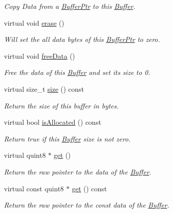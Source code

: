 \begin{DoxyCompactItemize}
\begin{DoxyCompactList}\small\item\em Copy Data from a \hyperlink{class_gost_crypt_1_1_buffer_ptr}{Buffer\+Ptr} to this \hyperlink{class_gost_crypt_1_1_buffer}{Buffer}. \end{DoxyCompactList}\item 
virtual void \hyperlink{class_gost_crypt_1_1_buffer_a6c340b4919d3a0476c6076136fe469a0}{erase} ()
\begin{DoxyCompactList}\small\item\em Will set the all data bytes of this \hyperlink{class_gost_crypt_1_1_buffer_ptr}{Buffer\+Ptr} to zero. \end{DoxyCompactList}\item 
virtual void \hyperlink{class_gost_crypt_1_1_buffer_af3b4e8576f58b4eb9bf3b0e819402db9}{free\+Data} ()
\begin{DoxyCompactList}\small\item\em Free the data of this \hyperlink{class_gost_crypt_1_1_buffer}{Buffer} and set its size to 0. \end{DoxyCompactList}\item 
virtual size\+\_\+t \hyperlink{class_gost_crypt_1_1_buffer_a5324726029e7f906f2f14e54eeb1ab82}{size} () const
\begin{DoxyCompactList}\small\item\em Return the size of this buffer in bytes. \end{DoxyCompactList}\item 
virtual bool \hyperlink{class_gost_crypt_1_1_buffer_ad193e36c7ef06d6e6c31d90c2c5608ed}{is\+Allocated} () const
\begin{DoxyCompactList}\small\item\em Return true if this \hyperlink{class_gost_crypt_1_1_buffer}{Buffer} size is not zero. \end{DoxyCompactList}\item 
virtual quint8 $\ast$ \hyperlink{class_gost_crypt_1_1_buffer_acdba1753b368a81c686afb8584173e54}{get} ()
\begin{DoxyCompactList}\small\item\em Return the raw pointer to the data of the \hyperlink{class_gost_crypt_1_1_buffer}{Buffer}. \end{DoxyCompactList}\item 
virtual const quint8 $\ast$ \hyperlink{class_gost_crypt_1_1_buffer_ae29a4a45510cadfdda632770f5b56d86}{get} () const
\begin{DoxyCompactList}\small\item\em Return the raw pointer to the const data of the \hyperlink{class_gost_crypt_1_1_buffer}{Buffer}. \end{DoxyCompactList}\item 

\end{DoxyCompactItemize}
